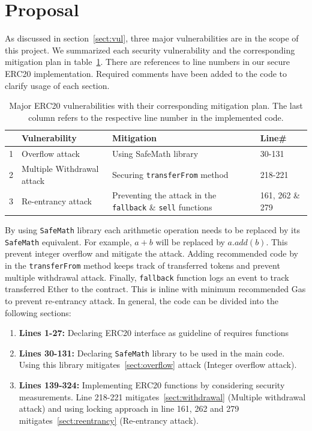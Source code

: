
\section{Proposal}
\label{sec:proposal}
As discussed in section~\ref{sect:vul}, three major vulnerabilities are in the scope of this project. We summarized each security vulnerability and the corresponding mitigation plan in table~\ref{tbl:attack}. There are references to line numbers in our secure ERC20 implementation. Required comments have been added to the code to clarify usage of each section.
\begin{table}[t]
	\begin{tabular}{|l|l|l|l|}
		\hline
		\textbf{} & \textbf{Vulnerability}     & \textbf{Mitigation}                            & \textbf{Line\#} \\ \hline		\hline
		1           & Overflow attack            & Using SafeMath library                         & 30-131                \\ \hline
		2           & Multiple Withdrawal attack & Securing \texttt{transferFrom} method                   & 218-221              \\ \hline
		3           & Re-entrancy attack         & Preventing the attack in the \texttt{fallback} \& \texttt{sell} functions & 161, 262 \& 279              \\ \hline
	\end{tabular}
	\caption{Major ERC20 vulnerabilities with their corresponding mitigation plan. The last column refers to the respective line number in the implemented code.}
	\label{tbl:attack}
\end{table}

By using \texttt{SafeMath} library each arithmetic operation needs to be replaced by its \texttt{SafeMath} equivalent. For example, $a+b$ will be replaced by $a.add(b)$. This prevent integer overflow and mitigate the attack. Adding recommended code by \cite{ERC20MWA} in the \texttt{transferFrom} method keeps track of transferred tokens and prevent multiple withdrawal attack. Finally, \texttt{fallback} function logs an event to track transferred Ether to the contract. This is inline with minimum recommended Gas to prevent re-entrancy attack. In general, the code can be divided into the following sections:
\begin{enumerate}[]
	\item \textbf{Lines 1-27:} Declaring ERC20 interface as guideline of requires functions
	\item \textbf{Lines 30-131:} Declaring \texttt{SafeMath} library to be used in the main code. Using this library mitigates~\ref{sect:overflow} attack (Integer overflow attack).
	\item \textbf{Lines 139-324:} Implementing ERC20 functions by considering security measurements. Line 218-221 mitigates~\ref{sect:withdrawal} (Multiple withdrawal attack) and using locking approach in line 161, 262 and 279 mitigates~\ref{sect:reentrancy} (Re-entrancy attack).
\end{enumerate}

